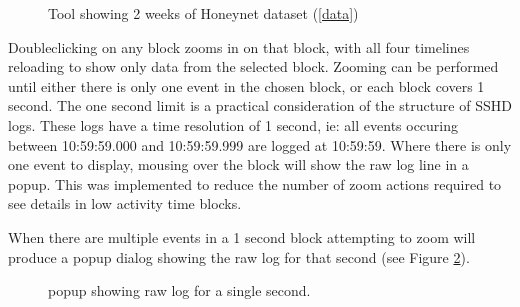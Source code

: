 \begin{figure}[tbh!]
\caption{\protect\label{zoomed_in}Tool showing 2 weeks of Honeynet dataset (\ref{data})}
\end{figure}

Doubleclicking on any block zooms in on that block, with all four timelines reloading to show only data from the selected block. 
Zooming can be performed until either there is only one event in the chosen block, or each block covers 1 second. The one second limit is a practical consideration of the structure of SSHD logs. These logs have a time resolution of 1 second, ie:  all events occuring between 10:59:59.000 and 10:59:59.999 are logged at 10:59:59. Where there is only one event to display, mousing over the block will show the raw log line in a popup. This was implemented to reduce the number of zoom actions required to see details in low activity time blocks.

When there are multiple events in a 1 second block attempting to zoom will produce a popup dialog showing the raw log for that second (see Figure \ref{des_one_second}).

\begin{figure}[tbh]
\caption{\protect\label{des_one_second}popup showing raw log for a single second.}
\end{figure}

